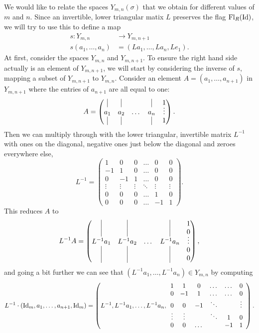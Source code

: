 We would like to relate the spaces $Y_{m,n}(\sigma)$ that we obtain
for different values of
$m$ and $n$. Since an invertible, lower triangular matix $L$ preserves
the flag $\mathrm{Fl}_R(\operatorname{Id})$, we will try to use this to define a map
\begin{align*}
  s : Y_{m,n} &\to Y_{m,n+1} \\
  s(a_1,\dots,a_{n}) &= (La_1,\dots,La_{n},Le_1).
\end{align*}
At first, consider the spaces $Y_{m,n}$ and $Y_{m,n+1}$.
To ensure the right hand side actually is an element of $Y_{m,n+1}$,
we will start by considering the inverse of $s$, mapping a subset of
$Y_{m,n+1}$ to $Y_{m,n}$.
Consider an element $A=(a_1,\dots,a_{n+1})$ in $Y_{m,n+1}$ where
the entries of $a_{n+1}$ are all equal to one:
\[ A = 
\begin{pmatrix}
  \vrule & \vrule & & \vrule & \vspace{-0.5em}
  1 \\
  a_1 & a_2 & \dots & a_{n} & \vdots \\
  \vrule & \vrule & & \vrule & 1
\end{pmatrix}. \] 
Then we can multiply through with the lower triangular, invertible
matrix $L^{-1}$ with ones on the diagonal, negative ones just below
the diagonal and zeroes everywhere else,
\[ L^{-1} =
\begin{pmatrix}
   1 &  0 & 0 & \dots &  0 & 0 \\
  -1 &  1 & 0 & \dots &  0 & 0 \\
   0 & -1 & 1 & \dots &  0 & 0 \\
   \vdots & \vdots & \vdots & \ddots & \vdots & \vdots \\
   0 &  0 & 0 & \dots &  1 & 0 \\
   0 &  0 & 0 & \dots & -1 & 1
\end{pmatrix}. \]
This reduces $A$ to
\[ L^{-1}A =
\begin{pmatrix}
  \vrule & \vrule & & \vrule & 
  1 \\
  \vrule & \vrule & & \vrule & \vspace{-0.5em}
  0 \\
  L^{-1}a_1 & L^{-1}a_2 & \dots & L^{-1}a_{n} & \vdots \\
  \vrule & \vrule & & \vrule & 0 \\
  \vrule & \vrule & & \vrule & 0
\end{pmatrix}, \]
and going a bit further we can see that
$(L^{-1}a_1,\dots,L^{-1}a_{n}) \in Y_{m,n}$ by computing
\[ L^{-1}\cdot \left(\operatorname{Id}_m,a_1,\dots,a_{n+1},\operatorname{Id}_m\right) =
\left(L^{-1},L^{-1}a_1,\dots,L^{-1}a_{n},
  \begin{array}{cccccc}
    1 & 1 & 0 & \dots & \dots & 0 \\
    0 & -1 & 1 & \dots & \dots& 0\\
    0 & 0 & -1 & \ddots & & \vdots\\
    \vdots & \vdots & & \ddots & 1 & 0 \\
    0 & 0 & \dots & & -1& 1
  \end{array}
\right). \] 
